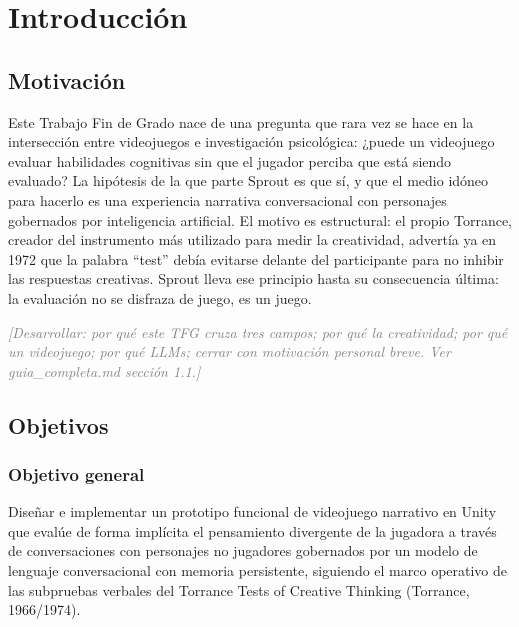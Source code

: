 \documentclass[12pt,twoside,titlepage]{report}
\begin{document}
\chapter{Introducción}



\pagestyle{fancy}


\setlength{\parskip}{0.75em}
\renewcommand{\baselinestretch}{1.25}
\setcounter{page}{1}




\section{Motivación}

Este Trabajo Fin de Grado nace de una pregunta que rara vez se hace en la intersección entre videojuegos e investigación psicológica: ¿puede un videojuego evaluar habilidades cognitivas sin que el jugador perciba que está siendo evaluado? La hipótesis de la que parte Sprout es que sí, y que el medio idóneo para hacerlo es una experiencia narrativa conversacional con personajes gobernados por inteligencia artificial. El motivo es estructural: el propio Torrance, creador del instrumento más utilizado para medir la creatividad, advertía ya en 1972 que la palabra ``test'' debía evitarse delante del participante para no inhibir las respuestas creativas. Sprout lleva ese principio hasta su consecuencia última: la evaluación no se disfraza de juego, es un juego.

\textcolor{gray}{\textit{[Desarrollar: por qué este TFG cruza tres campos; por qué la creatividad; por qué un videojuego; por qué LLMs; cerrar con motivación personal breve. Ver guia\_completa.md sección 1.1.]}}

\section{Objetivos}

\subsection{Objetivo general}

Diseñar e implementar un prototipo funcional de videojuego narrativo en Unity que evalúe de forma implícita el pensamiento divergente de la jugadora a través de conversaciones con personajes no jugadores gobernados por un modelo de lenguaje conversacional con memoria persistente, siguiendo el marco operativo de las subpruebas verbales del Torrance Tests of Creative Thinking (Torrance, 1966/1974).
\end{document}
